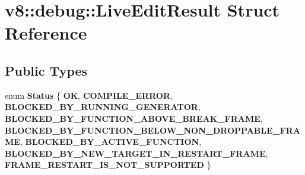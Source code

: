 \hypertarget{structv8_1_1debug_1_1LiveEditResult}{}\section{v8\+:\+:debug\+:\+:Live\+Edit\+Result Struct Reference}
\label{structv8_1_1debug_1_1LiveEditResult}
\subsection*{Public Types}
\begin{DoxyCompactItemize}
\item 
\mbox{\label{structv8_1_1debug_1_1LiveEditResult_a0c9329ad68bf15a8a449e87f21f63d5d}} 
enum {\bfseries Status} \{ \newline
{\bfseries OK}, 
{\bfseries C\+O\+M\+P\+I\+L\+E\+\_\+\+E\+R\+R\+OR}, 
{\bfseries B\+L\+O\+C\+K\+E\+D\+\_\+\+B\+Y\+\_\+\+R\+U\+N\+N\+I\+N\+G\+\_\+\+G\+E\+N\+E\+R\+A\+T\+OR}, 
{\bfseries B\+L\+O\+C\+K\+E\+D\+\_\+\+B\+Y\+\_\+\+F\+U\+N\+C\+T\+I\+O\+N\+\_\+\+A\+B\+O\+V\+E\+\_\+\+B\+R\+E\+A\+K\+\_\+\+F\+R\+A\+ME}, 
\newline
{\bfseries B\+L\+O\+C\+K\+E\+D\+\_\+\+B\+Y\+\_\+\+F\+U\+N\+C\+T\+I\+O\+N\+\_\+\+B\+E\+L\+O\+W\+\_\+\+N\+O\+N\+\_\+\+D\+R\+O\+P\+P\+A\+B\+L\+E\+\_\+\+F\+R\+A\+ME}, 
{\bfseries B\+L\+O\+C\+K\+E\+D\+\_\+\+B\+Y\+\_\+\+A\+C\+T\+I\+V\+E\+\_\+\+F\+U\+N\+C\+T\+I\+ON}, 
{\bfseries B\+L\+O\+C\+K\+E\+D\+\_\+\+B\+Y\+\_\+\+N\+E\+W\+\_\+\+T\+A\+R\+G\+E\+T\+\_\+\+I\+N\+\_\+\+R\+E\+S\+T\+A\+R\+T\+\_\+\+F\+R\+A\+ME}, 
{\bfseries F\+R\+A\+M\+E\+\_\+\+R\+E\+S\+T\+A\+R\+T\+\_\+\+I\+S\+\_\+\+N\+O\+T\+\_\+\+S\+U\+P\+P\+O\+R\+T\+ED}
 \}
\end{DoxyCompactItemize}
